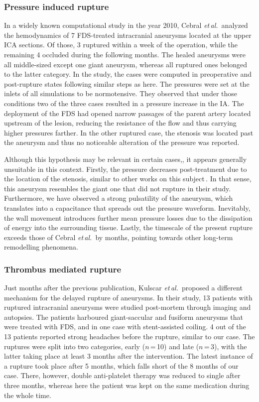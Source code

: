 \subsubsection*{Pressure induced rupture}
In a widely known computational study in the year 2010, Cebral \textit{et\,al.}\,\cite{Cebral2011} analyzed the hemodynamics of 7 FDS-treated intracranial aneurysms located at the upper ICA sections. Of those, 3 ruptured within a week of the operation, while the remaining 4 occluded during the following months. The healed aneurysms were all middle-sized except one giant aneurysm, whereas all ruptured ones belonged to the latter category. In the study, the cases were computed in preoperative and post-rupture states following similar steps as here. The pressures were set at the inlets of all simulations to be normotensive. They observed that under those conditions two of the three cases resulted in a pressure increase in the IA\@. The deployment of the FDS had opened narrow passages of the parent artery located upstream of the lesion, reducing the resistance of the flow and thus carrying higher pressures farther. In the other ruptured case, the stenosis was located past the aneurysm and thus no noticeable alteration of the pressure was reported.

Although this hypothesis may be relevant in certain cases,\cite{Hirato2023}, it appears generally unsuitable in this context. Firstly, the pressure decreases post-treatment due to the location of the stenosis, similar to other works on this subject\,\cite{Li2019}. In that sense, this aneurysm resembles the giant one that did not rupture in their study. Furthermore, we have observed a strong pulsatility of the aneurysm, which translates into a capacitance that spreads out the pressure waveform. Inevitably, the wall movement introduces further mean pressure losses due to the dissipation of energy into the surrounding tissue. Lastly, the timescale of the present rupture exceeds those of Cebral \textit{et\,al.}\,\cite{Cebral2011} by months, pointing towards other long-term remodelling phenomena.


\subsubsection*{Thrombus mediated rupture}
Just months after the previous publication, Kulscar \textit{et\,al.}\,\cite{Kulcsar2011} proposed a different mechanism for the delayed rupture of aneurysms. In their study, 13 patients with ruptured intracranial aneurysms were studied post-mortem through imaging and autopsies. The patients harboured giant-saccular and fusiform aneurysms that were treated with FDS, and in one case with stent-assisted coiling. 4 out of the 13 patients reported strong headaches before the rupture, similar to our case. The ruptures were split into two categories, early ($n$\,=\,10) and late ($n$\,=\,3), with the latter taking place at least 3 months after the intervention. The latest instance of a rupture took place after 5 months, which falls short of the 8 months of our case. There, however, double anti-platelet therapy was reduced to single after three months, whereas here the patient was kept on the same medication during the whole time.

